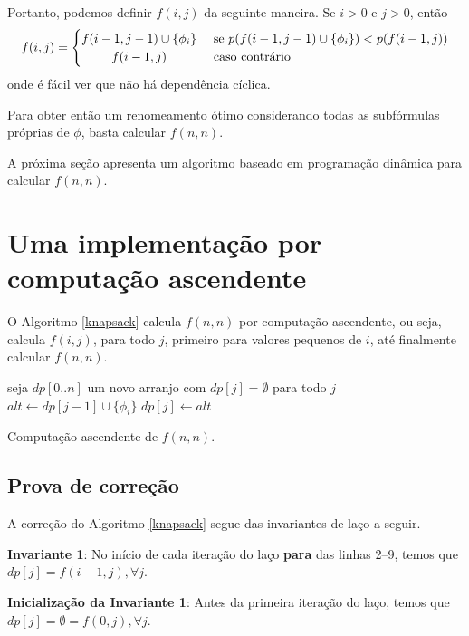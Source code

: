 Portanto, podemos definir $f(i,j)$ da seguinte maneira. Se $i > 0$ e $j > 0$, então
\[
f(i,j) =
\begin{cases} 
\hfill f(i-1,j-1) \cup \{\phi_i \}   \hfill & \text{ se } p(f(i-1,j-1) \cup \{\phi_i \}) < p(f(i-1,j)) \\
\hfill f(i-1,j) \hfill & \text{ caso contrário} \\
\end{cases}
\]
onde é fácil ver que não há dependência cíclica.

Para obter então um renomeamento ótimo considerando todas as subfórmulas próprias de $\phi$, basta calcular $f(n,n)$.

A próxima seção apresenta um algoritmo baseado em programação dinâmica \cite{bellman2015applied} para calcular $f(n,n)$.

\section{Uma implementação por computação ascendente}

\indent

O Algoritmo \ref{knapsack} calcula $f(n,n)$ por computação ascendente, ou seja, calcula $f(i,j)$, para todo $j$, primeiro para valores pequenos de $i$, até finalmente calcular $f(n,n)$.

\begin{algorithm}
	\begin{algorithmic}[1]
		\State seja $dp[0..n]$ um novo arranjo com $dp[j] = \emptyset$ para todo $j$
				\State $alt \gets dp[j-1] \cup \{\phi_i\}$
					\State $dp[j] \gets alt$
				\EndIf
			\EndFor
		\EndFor
	\end{algorithmic}
	\caption{Computação ascendente de $f(n,n)$.}
	\label{knapsack}
\end{algorithm}

\subsection{Prova de correção}

\indent

A correção do Algoritmo \ref{knapsack} segue das invariantes de laço a seguir.

\textbf{Invariante 1}: No início de cada iteração do laço \textbf{para} das linhas 2--9, temos que $dp[j] = f(i-1,j), \forall j$.

\textbf{Inicialização da Invariante 1}: Antes da primeira iteração do laço, temos que\break $dp[j] = \emptyset = f(0,j), \forall j$. 

